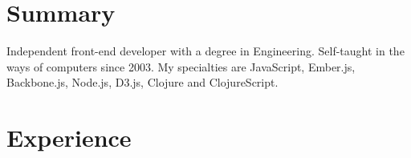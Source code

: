 \documentclass[letterpaper]{deedy-resume} %
\begin{document}
%
%
%
%
%
%
%
%
%
%


\section{Summary}
\flushleft\location{} %

Independent front-end developer with a degree in Engineering. Self-taught
in the ways of computers since 2003. My specialties are JavaScript,
Ember.js, Backbone.js, Node.js, D3.js, Clojure and ClojureScript.

\sectionspace %

\section{Experience}
\end{document}
